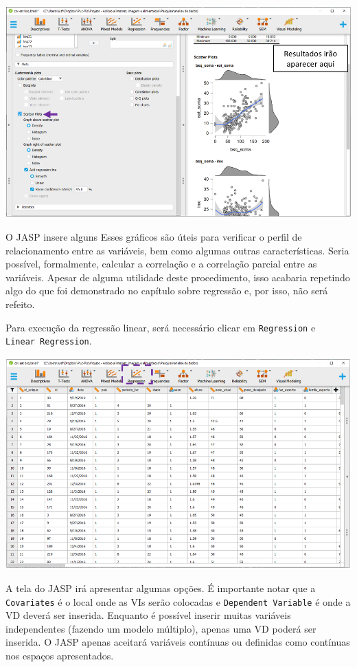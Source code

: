 \documentclass[
]{book}
\begin{document}
\includegraphics{./img/cap_reg_multipla_plots2.png}

O JASP insere alguns Esses gráficos são úteis para verificar o perfil de relacionamento entre as variáveis, bem como algumas outras características. Seria possível, formalmente, calcular a correlação e a correlação parcial entre as variáveis. Apesar de alguma utilidade deste procedimento, isso acabaria repetindo algo do que foi demonstrado no capítulo sobre regressão e, por isso, não será refeito.

Para execução da regressão linear, será necessário clicar em \texttt{Regression} e \texttt{Linear\ Regression}.

\includegraphics{./img/cap_reg_multipla_interface.png}

A tela do JASP irá apresentar algumas opções. É importante notar que a \texttt{Covariates} é o local onde as VIs serão colocadas e \texttt{Dependent\ Variable} é onde a VD deverá ser inserida. Enquanto é possível inserir muitas variáveis independentes (fazendo um modelo múltiplo), apenas uma VD poderá ser inserida. O JASP apenas aceitará variáveis contínuas ou definidas como contínuas nos espaços apresentados.
\end{document}
